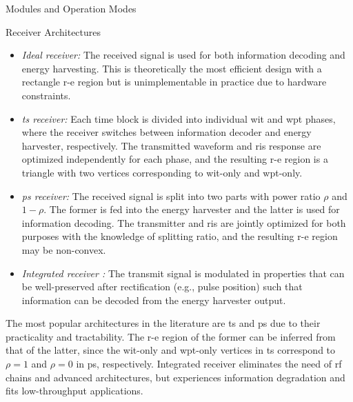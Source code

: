 \begin{section}{}
\begin{subsection}{Modules and Operation Modes}
\begin{subsubsection}{Receiver Architectures}
			\begin{itemize}
				\item \emph{Ideal receiver:} The received signal is used for both information decoding and energy harvesting. This is theoretically the most efficient design with a rectangle \gls{r-e} region but is unimplementable in practice due to hardware constraints.
				\item \emph{\gls{ts} receiver:} Each time block is divided into individual \gls{wit} and \gls{wpt} phases, where the receiver switches between information decoder and energy harvester, respectively. The transmitted waveform and \gls{ris} response are optimized independently for each phase, and the resulting \gls{r-e} region is a triangle with two vertices corresponding to \gls{wit}-only and \gls{wpt}-only.
				\item \emph{\gls{ps} receiver:} The received signal is split into two parts with power ratio $\rho$ and $1{-}\rho$. The former is fed into the energy harvester and the latter is used for information decoding. The transmitter and \gls{ris} are jointly optimized for both purposes with the knowledge of splitting ratio, and the resulting \gls{r-e} region may be non-convex.
				\item \emph{Integrated receiver \cite{Kim2021a}:} The transmit signal is modulated in properties that can be well-preserved after rectification (e.g., pulse position) such that information can be decoded from the energy harvester output.
			\end{itemize}

			The most popular architectures in the literature are \gls{ts} and \gls{ps} due to their practicality and tractability.
			The \gls{r-e} region of the former can be inferred from that of the latter, since the \gls{wit}-only and \gls{wpt}-only vertices in \gls{ts} correspond to $\rho=1$ and $\rho=0$ in \gls{ps}, respectively.
			Integrated receiver eliminates the need of \gls{rf} chains and advanced architectures, but experiences information degradation and fits low-throughput applications.
		\end{subsubsection}
	\end{subsection}
\end{section}

